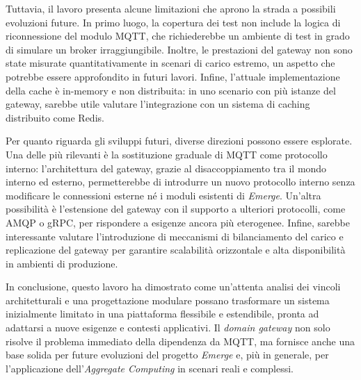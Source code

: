 Tuttavia, il lavoro presenta alcune limitazioni che aprono la strada a possibili evoluzioni future. In primo luogo, la copertura dei test non include la logica di riconnessione del modulo \ac{MQTT}, che richiederebbe un ambiente di test in grado di simulare un broker irraggiungibile. Inoltre, le prestazioni del gateway non sono state misurate quantitativamente in scenari di carico estremo, un aspetto che potrebbe essere approfondito in futuri lavori. Infine, l'attuale implementazione della cache è in-memory e non distribuita: in uno scenario con più istanze del gateway, sarebbe utile valutare l'integrazione con un sistema di caching distribuito come Redis.

Per quanto riguarda gli sviluppi futuri, diverse direzioni possono essere esplorate. Una delle più rilevanti è la sostituzione graduale di \ac{MQTT} come protocollo interno: l'architettura del gateway, grazie al disaccoppiamento tra il mondo interno ed esterno, permetterebbe di introdurre un nuovo protocollo interno senza modificare le connessioni esterne né i moduli esistenti di \textit{Emerge}. Un'altra possibilità è l'estensione del gateway con il supporto a ulteriori protocolli, come \ac{AMQP} o \ac{gRPC}, per rispondere a esigenze ancora più eterogenee. Infine, sarebbe interessante valutare l'introduzione di meccanismi di bilanciamento del carico e replicazione del gateway per garantire scalabilità orizzontale e alta disponibilità in ambienti di produzione.

In conclusione, questo lavoro ha dimostrato come un'attenta analisi dei vincoli architetturali e una progettazione modulare possano trasformare un sistema inizialmente limitato in una piattaforma flessibile e estendibile, pronta ad adattarsi a nuove esigenze e contesti applicativi. Il \textit{domain gateway} non solo risolve il problema immediato della dipendenza da \ac{MQTT}, ma fornisce anche una base solida per future evoluzioni del progetto \textit{Emerge} e, più in generale, per l'applicazione dell'\textit{Aggregate Computing} in scenari reali e complessi.